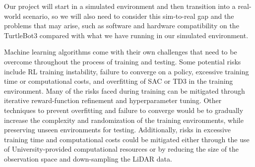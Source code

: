 \documentclass[conference, 11pt]{IEEEtran}
\begin{document}
Our project will start in a simulated environment and then transition into a real-world scenario, so we will also need to consider this sim-to-real gap and the problems that may arise, such as software and hardware compatibility on the TurtleBot3 compared with what we have running in our simulated environment.

Machine learning algorithms come with their own challenges that need to be overcome throughout the process of training and testing.
Some potential risks include RL training instability, failure to converge on a policy, excessive training time or computational costs, and overfitting of SAC or TD3 in the training environment.
Many of the risks faced during training can be mitigated through iterative reward-function refinement and hyperparameter tuning.
Other techniques to prevent overfitting and failure to converge would be to gradually increase the complexity and randomization of the training environments, while preserving unseen environments for testing.
Additionally, risks in excessive training time and computational costs could be mitigated either through the use of University-provided computational resources or by reducing the size of the observation space and down-sampling the LiDAR data. 





\end{document}
